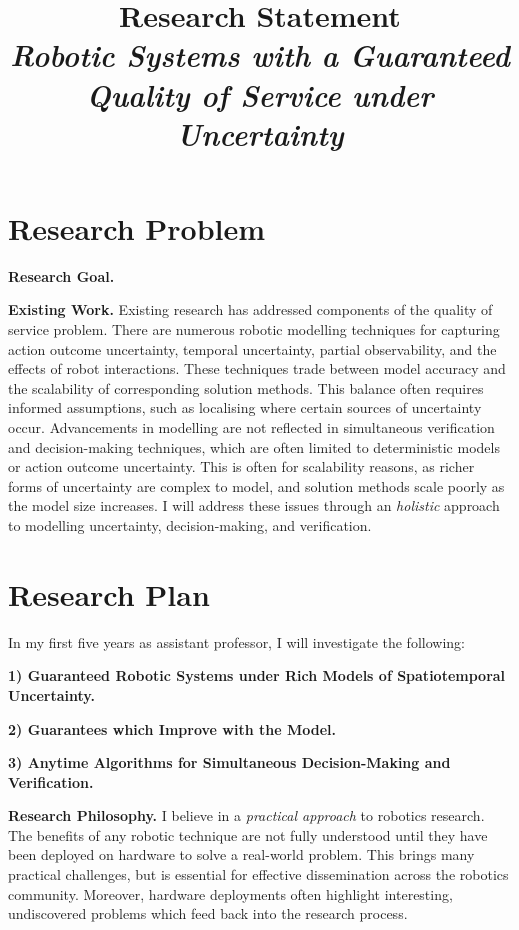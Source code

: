 \documentclass[12pt]{article}
\title{Research Statement\\ \large \emph{Robotic Systems with a Guaranteed Quality of Service under Uncertainty}}
\date{}
\author{}
\begin{document}
\maketitle
\thispagestyle{empty}

\section*{Research Problem}

\vspace*{1ex}\noindent\textbf{Research Goal.}

\vspace*{1ex}\noindent\textbf{Existing Work.} Existing research has addressed components of the quality of service problem.
%
There are numerous robotic modelling techniques for capturing action outcome uncertainty, temporal uncertainty, partial observability, and the effects of robot interactions.
%
These techniques trade between model accuracy and the scalability of corresponding solution methods.
%
This balance often requires informed assumptions, such as localising where certain sources of uncertainty occur.
%
Advancements in modelling are not reflected in simultaneous verification and decision-making techniques, which are often limited to deterministic models or action outcome uncertainty.
%
This is often for scalability reasons, as richer forms of uncertainty are complex to model, and solution methods scale poorly as the model size increases.
%
I will address these issues through an \emph{holistic} approach to modelling uncertainty, decision-making, and verification.

\section*{Research Plan}

In my first five years as assistant professor, I will investigate the following:

\vspace*{1ex}\noindent\textbf{1) Guaranteed Robotic Systems under Rich Models of Spatiotemporal Uncertainty.}

\vspace*{1ex}\noindent\textbf{2) Guarantees which Improve with the Model.}

\vspace*{1ex}\noindent\hypertarget{topicthree}{\textbf{3) Anytime Algorithms for Simultaneous Decision-Making and Verification.}}

\vspace*{1ex}\noindent\textbf{Research Philosophy.} I believe in a \emph{practical approach} to robotics research.
%
The benefits of any robotic technique are not fully understood until they have been deployed on hardware to solve a real-world problem.
%
This brings many practical challenges, but is essential for effective dissemination across the robotics community.
%
Moreover, hardware deployments often highlight interesting, undiscovered problems which feed back into the research process.
\end{document}
